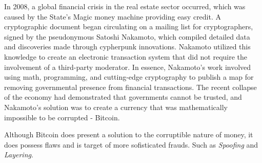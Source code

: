 In 2008, a global financial crisis in the real estate sector occurred, which was caused by the State's Magic money machine providing easy credit. A cryptographic document began circulating on a mailing list for cryptographers, signed by the pseudonymous Satoshi Nakamoto, which compiled detailed data and discoveries made through cypherpunk innovations. Nakamoto utilized this knowledge to create an electronic transaction system that did not require the involvement of a third-party moderator. In essence, Nakamoto's work involved using math, programming, and cutting-edge cryptography to publish a map for removing governmental presence from financial transactions. The recent collapse of the economy had demonstrated that governments cannot be trusted, and Nakamoto's solution was to create a currency that was mathematically impossible to be corrupted - Bitcoin.

Although Bitcoin does present a solution to the corruptible nature of money, it does possess flaws and is target of more sofisticated frauds. Such as \textit{Spoofing} and \textit{Layering}. 